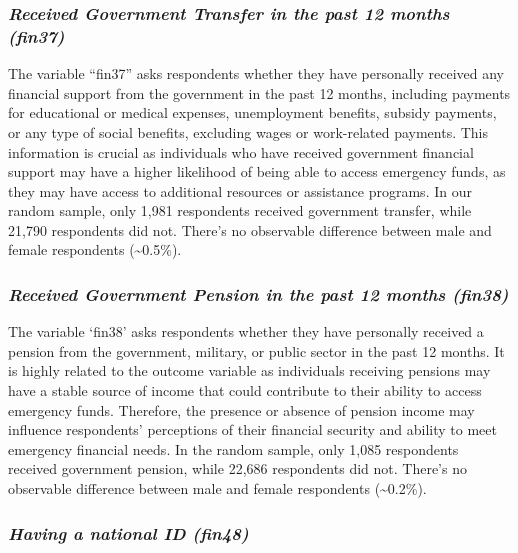 \documentclass[12pt]{article}
\begin{document}
\hypertarget{received-government-transfer-in-the-past-12-months-fin37}{%
\subsubsection{\texorpdfstring{\emph{Received Government Transfer in the
past 12 months
(fin37)}}{Received Government Transfer in the past 12 months (fin37)}}\label{received-government-transfer-in-the-past-12-months-fin37}}

The variable ``fin37'' asks respondents whether they have personally
received any financial support from the government in the past 12
months, including payments for educational or medical expenses,
unemployment benefits, subsidy payments, or any type of social benefits,
excluding wages or work-related payments. This information is crucial as
individuals who have received government financial support may have a
higher likelihood of being able to access emergency funds, as they may
have access to additional resources or assistance programs. In our
random sample, only 1,981 respondents received government transfer,
while 21,790 respondents did not. There's no observable difference
between male and female respondents (\textasciitilde0.5\%).

\hypertarget{received-government-pension-in-the-past-12-months-fin38}{%
\subsubsection{\texorpdfstring{\emph{Received Government Pension in the
past 12 months
(fin38)}}{Received Government Pension in the past 12 months (fin38)}}\label{received-government-pension-in-the-past-12-months-fin38}}

The variable `fin38' asks respondents whether they have personally
received a pension from the government, military, or public sector in
the past 12 months. It is highly related to the outcome variable as
individuals receiving pensions may have a stable source of income that
could contribute to their ability to access emergency funds. Therefore,
the presence or absence of pension income may influence respondents'
perceptions of their financial security and ability to meet emergency
financial needs. In the random sample, only 1,085 respondents received
government pension, while 22,686 respondents did not. There's no
observable difference between male and female respondents
(\textasciitilde0.2\%).

\hypertarget{having-a-national-id-fin48}{%
\subsubsection{\texorpdfstring{\emph{Having a national ID
(fin48)}}{Having a national ID (fin48)}}\label{having-a-national-id-fin48}}
\end{document}
